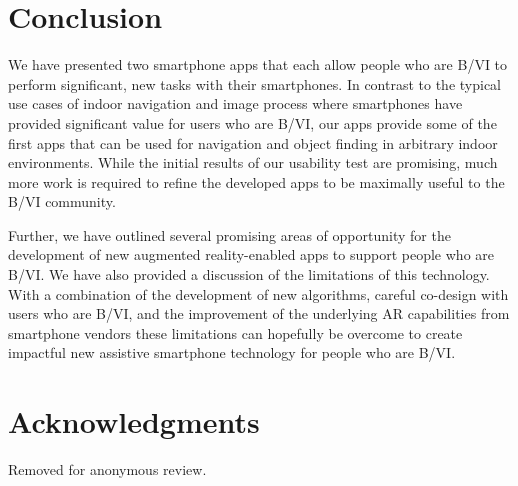 \documentclass[chi_draft]{sigchi}
\begin{document}
\balance{}

\section{Conclusion}
We have presented two smartphone apps that each allow people who are B/VI to perform significant, new tasks with their smartphones.  In contrast to the typical use cases of indoor navigation and image process where smartphones have provided significant value for users who are B/VI, our apps provide some of the first apps that can be used for navigation and object finding in arbitrary indoor environments.  While the initial results of our usability test are promising, much more work is required to refine the developed apps to be maximally useful to the B/VI community.

Further, we have outlined several promising areas of opportunity for the development of new augmented reality-enabled apps to support people who are B/VI.  We have also provided a discussion of the limitations of this technology.  With a combination of the development of new algorithms, careful co-design with users who are B/VI, and the improvement of the underlying AR capabilities from smartphone vendors these limitations can hopefully be overcome to create impactful new assistive smartphone technology for people who are B/VI.  

\section{Acknowledgments}
Removed for anonymous review.


\newpage


\end{document}

